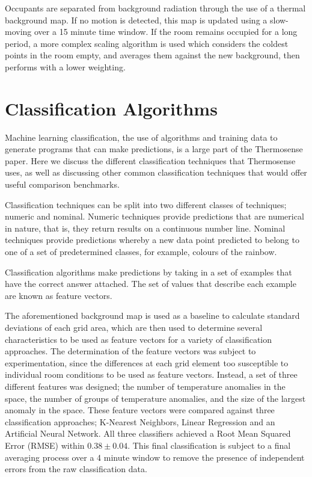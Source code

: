 \documentclass[../thesis/thesis.tex]{subfiles}
\begin{document}
Occupants are separated from background radiation through the use of a thermal background map. If no motion is detected, this map is updated using a slow-moving \emwa over a 15 minute time window. If the room remains occupied for a long period, a more complex scaling algorithm is used which considers the coldest points in the room empty, and averages them against the new background, then performs \emwa with a lower weighting.

\section{Classification Algorithms}
Machine learning classification, the use of algorithms and training data to generate programs that can make predictions, is a large part of the Thermosense paper. Here we discuss the different classification techniques that Thermosense uses, as well as discussing other common classification techniques that would offer useful comparison benchmarks.

Classification techniques can be split into two different classes of techniques; numeric and nominal. Numeric techniques provide predictions that are numerical in nature, that is, they return results on a continuous number line. Nominal techniques provide predictions whereby a new data point predicted to belong to one of a set of predetermined classes, for example, colours of the rainbow.

Classification algorithms make predictions by taking in a set of examples that have the correct answer attached. The set of values that describe each example are known as feature vectors.

The aforementioned background map is used as a baseline to calculate standard deviations of each grid area, which are then used to determine several characteristics to be used as feature vectors for a variety of classification approaches. The determination of the feature vectors was subject to experimentation, since the differences at each grid element too susceptible to individual room conditions to be used as feature vectors. Instead, a set of three different features was designed; the number of temperature anomalies in the space, the number of groups of temperature anomalies, and the size of the largest anomaly in the space. These feature vectors were compared against three classification approaches; K-Nearest Neighbors, Linear Regression and an Artificial Neural Network. All three classifiers achieved a Root Mean Squared Error (RMSE) within $0.38\pm0.04$. This final classification is subject to a final averaging process over a 4 minute window to remove the presence of independent errors from the raw classification data.
\end{document}
